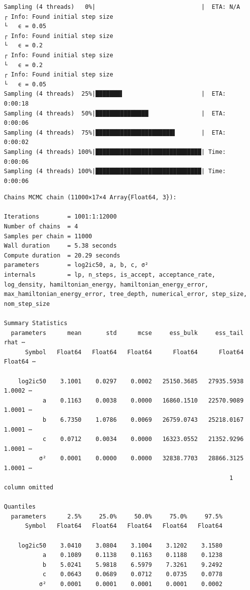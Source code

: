 \documentclass[
]{scrartcl}
\begin{document}
\begin{verbatim}
Sampling (4 threads)   0%|                              |  ETA: N/A
┌ Info: Found initial step size
└   ϵ = 0.05
┌ Info: Found initial step size
└   ϵ = 0.2
┌ Info: Found initial step size
└   ϵ = 0.2
┌ Info: Found initial step size
└   ϵ = 0.05
Sampling (4 threads)  25%|███████▌                      |  ETA: 0:00:18
Sampling (4 threads)  50%|███████████████               |  ETA: 0:00:06
Sampling (4 threads)  75%|██████████████████████▌       |  ETA: 0:00:02
Sampling (4 threads) 100%|██████████████████████████████| Time: 0:00:06
Sampling (4 threads) 100%|██████████████████████████████| Time: 0:00:06
\end{verbatim}

\begin{verbatim}
Chains MCMC chain (11000×17×4 Array{Float64, 3}):

Iterations        = 1001:1:12000
Number of chains  = 4
Samples per chain = 11000
Wall duration     = 5.38 seconds
Compute duration  = 20.29 seconds
parameters        = log2ic50, a, b, c, σ²
internals         = lp, n_steps, is_accept, acceptance_rate, log_density, hamiltonian_energy, hamiltonian_energy_error, max_hamiltonian_energy_error, tree_depth, numerical_error, step_size, nom_step_size

Summary Statistics
  parameters      mean       std      mcse     ess_bulk     ess_tail      rhat ⋯
      Symbol   Float64   Float64   Float64      Float64      Float64   Float64 ⋯

    log2ic50    3.1001    0.0297    0.0002   25150.3685   27935.5938    1.0002 ⋯
           a    0.1163    0.0038    0.0000   16860.1510   22570.9089    1.0001 ⋯
           b    6.7350    1.0786    0.0069   26759.0743   25218.0167    1.0001 ⋯
           c    0.0712    0.0034    0.0000   16323.0552   21352.9296    1.0001 ⋯
          σ²    0.0001    0.0000    0.0000   32838.7703   28866.3125    1.0001 ⋯
                                                                1 column omitted

Quantiles
  parameters      2.5%     25.0%     50.0%     75.0%     97.5%
      Symbol   Float64   Float64   Float64   Float64   Float64

    log2ic50    3.0410    3.0804    3.1004    3.1202    3.1580
           a    0.1089    0.1138    0.1163    0.1188    0.1238
           b    5.0241    5.9818    6.5979    7.3261    9.2492
           c    0.0643    0.0689    0.0712    0.0735    0.0778
          σ²    0.0001    0.0001    0.0001    0.0001    0.0002
\end{verbatim}
\end{document}
